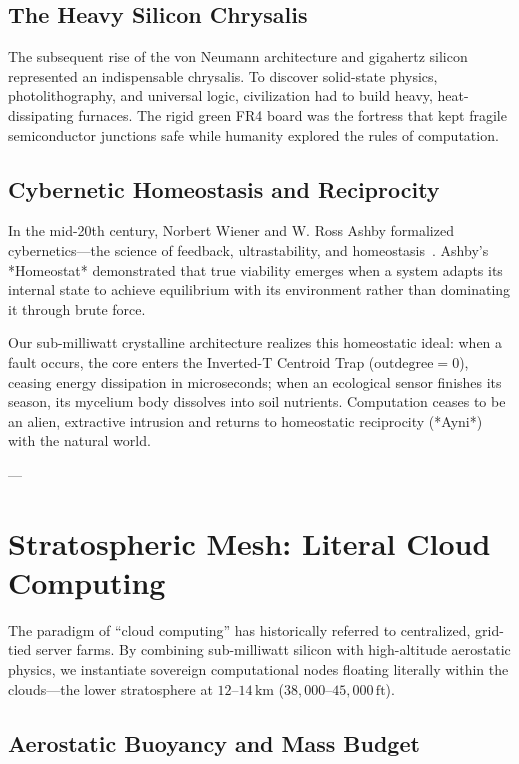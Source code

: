 \documentclass[10pt,twocolumn,letterpaper]{article}
\begin{document}
\subsection{The Heavy Silicon Chrysalis}
The subsequent rise of the von Neumann architecture and gigahertz silicon represented an indispensable chrysalis. To discover solid-state physics, photolithography, and universal logic, civilization had to build heavy, heat-dissipating furnaces. The rigid green FR4 board was the fortress that kept fragile semiconductor junctions safe while humanity explored the rules of computation.

\subsection{Cybernetic Homeostasis and Reciprocity}
In the mid-20th century, Norbert Wiener and W. Ross Ashby formalized cybernetics—the science of feedback, ultrastability, and homeostasis~\cite{wiener1948,ashby1952}. Ashby's *Homeostat* demonstrated that true viability emerges when a system adapts its internal state to achieve equilibrium with its environment rather than dominating it through brute force.

Our sub-milliwatt crystalline architecture realizes this homeostatic ideal: when a fault occurs, the core enters the Inverted-T Centroid Trap ($\text{outdegree} = 0$), ceasing energy dissipation in microseconds; when an ecological sensor finishes its season, its mycelium body dissolves into soil nutrients. Computation ceases to be an alien, extractive intrusion and returns to homeostatic reciprocity (*Ayni*) with the natural world.

---

\section{Stratospheric Mesh: Literal Cloud Computing}

The paradigm of ``cloud computing'' has historically referred to centralized, grid-tied server farms. By combining sub-milliwatt silicon with high-altitude aerostatic physics, we instantiate sovereign computational nodes floating literally within the clouds—the lower stratosphere at $12\text{--}14\,\text{km}$ ($38{,}000\text{--}45{,}000\,\text{ft}$).

\subsection{Aerostatic Buoyancy and Mass Budget}
\end{document}
